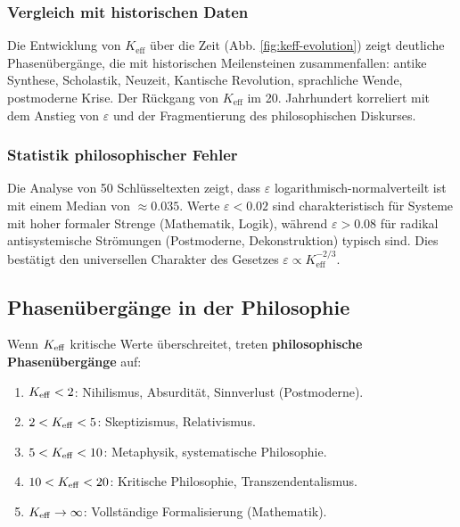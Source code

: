 \documentclass[12pt,a4paper]{article}
\newcommand{\eps}{\varepsilon}
\begin{document}
	\subsubsection{Vergleich mit historischen Daten}
	
	Die Entwicklung von \(K_{\mathrm{eff}}\) über die Zeit (Abb. \ref{fig:keff-evolution}) zeigt deutliche Phasenübergänge, die mit historischen Meilensteinen zusammenfallen: antike Synthese, Scholastik, Neuzeit, Kantische Revolution, sprachliche Wende, postmoderne Krise. Der Rückgang von \(K_{\mathrm{eff}}\) im 20. Jahrhundert korreliert mit dem Anstieg von \(\eps\) und der Fragmentierung des philosophischen Diskurses.
	
	\subsubsection{Statistik philosophischer Fehler}
	
	Die Analyse von 50 Schlüsseltexten zeigt, dass \(\eps\) logarithmisch-normalverteilt ist mit einem Median von \(\approx 0.035\). Werte \(\eps < 0.02\) sind charakteristisch für Systeme mit hoher formaler Strenge (Mathematik, Logik), während \(\eps > 0.08\) für radikal antisystemische Strömungen (Postmoderne, Dekonstruktion) typisch sind. Dies bestätigt den universellen Charakter des Gesetzes \(\eps \propto K_{\mathrm{eff}}^{-2/3}\).
	
	\subsection{Phasenübergänge in der Philosophie}
	
	Wenn \(\Keff\) kritische Werte überschreitet, treten \textbf{philosophische Phasenübergänge} auf:
	
	\begin{enumerate}
		\item \(\Keff < 2\): Nihilismus, Absurdität, Sinnverlust (Postmoderne).
		\item \(2 < \Keff < 5\): Skeptizismus, Relativismus.
		\item \(5 < \Keff < 10\): Metaphysik, systematische Philosophie.
		\item \(10 < \Keff < 20\): Kritische Philosophie, Transzendentalismus.
		\item \(\Keff \to \infty\): Vollständige Formalisierung (Mathematik).
	\end{enumerate}
	
\end{document}
